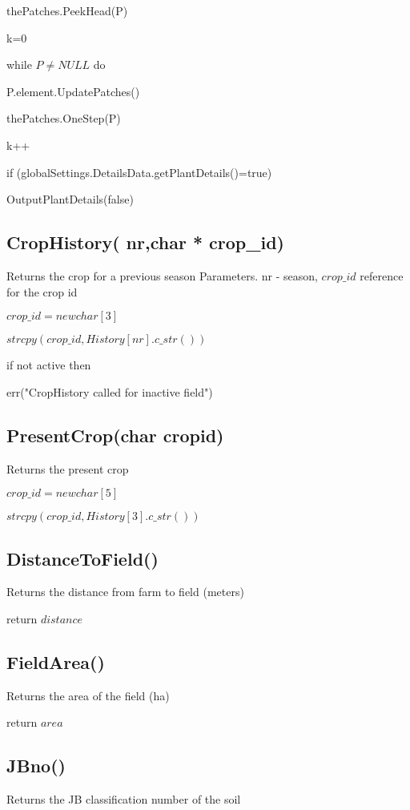 \documentclass[%
]{scrartcl}
\begin{document}
{{  	thePatches.PeekHead(P)
  	
    k=0
    
   while $P\ne NULL$ do
   
   \quad P.element.UpdatePatches()
   
    \quad    thePatches.OneStep(P)
    
     \quad   k++
   
   
   if (globalSettings.DetailsData.getPlantDetails()=true)
    
      \quad  OutputPlantDetails(false)


 \subsection{CropHistory( nr,char * crop\_id)}
Returns the crop for a previous season
Parameters.
   nr -  season, $crop\_id$ reference for the crop id

   $crop\_id =new char[3]$
   
   $strcpy(crop\_id,History[nr].c\_str())$
   
   if  not active then
   
   \quad     err("CropHistory called for inactive field")


\subsection{PresentCrop(char cropid)}
Returns the present crop

	$crop\_id =new char[5]$
	
	$strcpy(crop\_id,History[3].c\_str())$


\subsection{DistanceToField()}
Returns the distance from farm to field (meters)

	return $distance$


\subsection{FieldArea()}
Returns the area of the field (ha)

	return $area$


\subsection{JBno()}
Returns the JB classification number of the soil

}}
\end{document}

